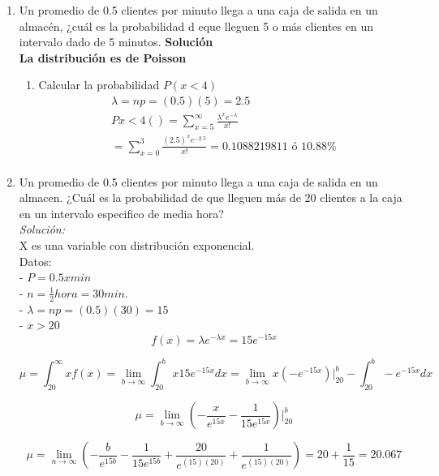 \begin{enumerate}
    \item Un promedio de 0.5 clientes por minuto llega a una caja de salida en un almacén, ¿cuál es la probabilidad d eque lleguen 5 o más clientes en un intervalo dado de 5 minutos.
    \textbf{Solución}\\
    \textbf{La distribución es de Poisson}
    \begin{enumerate}
        \item Calcular la probabilidad $P(x<4)$ \\
        \begin{gather*}
        \lambda = np=(0.5)(5) = 2.5\\
        Px<4()=\sum_{x=5}^{\infty}\frac{\lambda^{x}e^{-\lambda}}{x!}\\
        = \sum_{x=0}^{3}\frac{(2.5)^{x}e^{-2.5}}{x!}=0.1088219811\text{ ó } 10.88\%\\
        \end{gather*}
    \end{enumerate}
    \item Un promedio de 0.5 clientes por minuto llega a una caja de salida en un almacen. ¿Cuál es la probabilidad de que lleguen más de 20 clientes a la caja en un intervalo especifico de media hora? \\
    
    \textit{Solución: } \\
    X es una variable con distribución exponencial. \\
    Datos: \\
    - $ P = 0.5 x min $ \\
    - $ n = \frac{1}{2}hora = 30 min. $ \\
    - $\lambda = np = (0.5)(30) = 15 $\\
    - $ x > 20 $ \\
    $$ f(x) = \lambda e^{-\lambda x} = 15e^{-15x}$$
    
    $$ \mu = \int_{20}^{\infty} xf(x) = \lim_{b \to \infty} \int_{20}^{b} x15e^{-15x}dx = \lim_{b \to \infty} x(-e^{-15x}) \rvert_{20}^{b} - \int_{20}^{b} -e^{-15x}dx 
    $$
    
    $$ \mu = \lim_{b \to \infty} \left( - \frac{x}{e^{15x}} - \frac{1}{15e^{15x}}  \right)  \rvert_{20}^{b}
    $$
    
    $$ \mu = \lim_{n \to \infty} \left(  -\frac{b}{e^{15b}} - \frac{1}{15e^{15b}} + \frac{20}{e^{(15)(20)}} + \frac{1}{e^{(15)(20)}}  \right) = 20 + \frac{1}{15} = 20.067
    $$
    

\end{enumerate}
